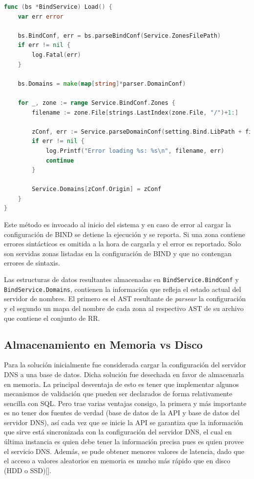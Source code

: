\begin{lstlisting}[frame=single, language=Go, caption=Implementación de la función \textbf{load} para BIND.]
func (bs *BindService) Load() {
	var err error

	bs.BindConf, err = bs.parseBindConf(Service.ZonesFilePath)
	if err != nil {
		log.Fatal(err)
	}

	bs.Domains = make(map[string]*parser.DomainConf)

	for _, zone := range Service.BindConf.Zones {
		filename := zone.File[strings.LastIndex(zone.File, "/")+1:]

		zConf, err := Service.parseDomainConf(setting.Bind.LibPath + filename)
		if err != nil {
			log.Printf("Error loading %s: %s\n", filename, err)
			continue
		}

		Service.Domains[zConf.Origin] = zConf
	}
}
\end{lstlisting}

Este método es invocado al inicio del sistema y en caso de error al cargar la configuración de BIND se detiene la ejecución y se reporta. Si una zona contiene errores sintácticos es omitida a la hora de cargarla y el error es reportado. Solo son servidas zonas listadas en la configuración de BIND y que no contengan errores de sintaxis.

Las estructuras de datos resultantes almacenadas en \verb|BindService.BindConf| y \verb|BindService.Domains|, contienen la información que refleja el estado actual del servidor de nombres. El primero es el AST resultante de \textit{parsear} la configuración y el segundo un mapa del nombre de cada zona al respectivo AST de su archivo que contiene el conjunto de RR.

\subsection{Almacenamiento en Memoria vs Disco}

Para la solución inicialmente fue considerada cargar la configuración del servidor DNS a una base de datos. Dicha solución fue desechada en favor de almacenarla en memoria. La principal desventaja de esto es tener que implementar algunos mecanismos de validación que pueden ser declarados de forma relativamente sencilla con SQL. Pero trae varias ventajas consigo, la primera y más importante es no tener dos fuentes de verdad (base de datos de la API y base de datos del servidor DNS), así cada vez que se inicie la API se garantiza que la información que sirve está sincronizada con la configuración del servidor DNS, el cual en última instancia es quien debe tener la información precisa pues es quien provee el servicio DNS. Además, se pude obtener menores valores de latencia, dado que el acceso a valores aleatorios en memoria es mucho más rápido que en disco (HDD o SSD)[\cite{jacobs2009pathologies}].

